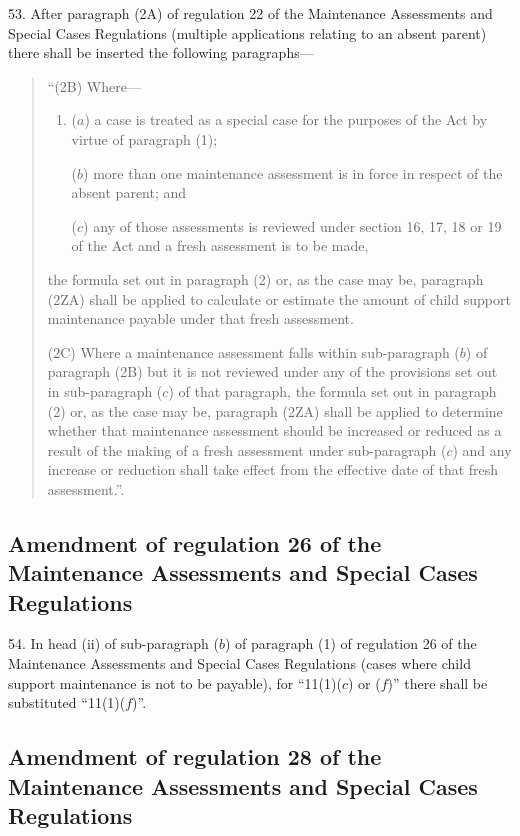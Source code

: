 \documentclass[12pt,a4paper]{article}
\begin{document}
53.  After paragraph (2A) of regulation 22 of the Maintenance Assessments and Special Cases Regulations (multiple applications relating to an absent parent) there shall be inserted the following paragraphs—
\begin{quotation}
“(2B) Where—
\begin{enumerate}\item[]
($a$) a case is treated as a special case for the purposes of the Act by virtue of paragraph (1);

($b$) more than one maintenance assessment is in force in respect of the absent parent; and

($c$) any of those assessments is reviewed under section 16, 17, 18 or 19 of the Act and a fresh assessment is to be made,
\end{enumerate}
the formula set out in paragraph (2) or, as the case may be, paragraph (2ZA) shall be applied to calculate or estimate the amount of child support maintenance payable under that fresh assessment.

(2C) Where a maintenance assessment falls within sub-\hspace{0pt}paragraph ($b$) of paragraph (2B) but it is not reviewed under any of the provisions set out in sub-paragraph ($c$) of that paragraph, the formula set out in paragraph (2) or, as the case may be, paragraph (2ZA) shall be applied to determine whether that maintenance assessment should be increased or reduced as a result of the making of a fresh assessment under sub-paragraph ($c$) and any increase or reduction shall take effect from the effective date of that fresh assessment.”.
\end{quotation}

\subsection[54. Amendment of regulation 26 of the Maintenance Assessments and Special Cases Regulations]{Amendment of regulation 26 of the Maintenance Assessments and Special Cases Regulations}

54.  In head (ii) of sub-paragraph ($b$) of paragraph (1) of regulation 26 of the Maintenance Assessments and Special Cases Regulations (cases where child support maintenance is not to be payable), for “11(1)($c$) or ($f$)” there shall be substituted “11(1)($f$)”.

\subsection[55. Amendment of regulation 28 of the Maintenance Assessments and Special Cases Regulations]{Amendment of regulation 28 of the Maintenance Assessments and Special Cases Regulations}
\end{document}
